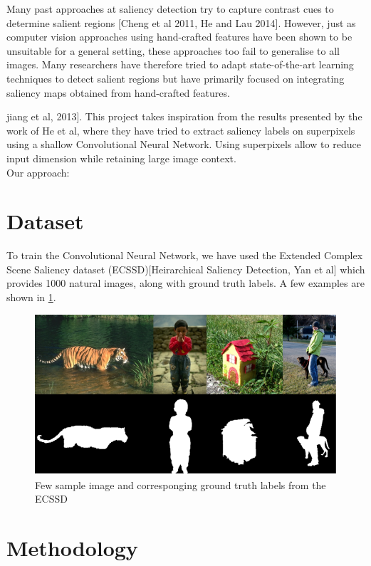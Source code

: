 \documentclass[journal]{IEEEtran}
\begin{document}
Many past approaches at saliency detection try to capture contrast cues to determine salient regions [Cheng et al 2011, He and Lau 2014]. However, just as computer vision approaches using hand-crafted features have been shown to be unsuitable for a general setting, these approaches too fail to generalise to all images. Many researchers have therefore tried to adapt state-of-the-art learning techniques to detect salient regions but have primarily focused on integrating saliency maps obtained from hand-crafted features. {jiang et al, 2013]. This project takes inspiration from the results presented by the work of He et al, where they have tried to extract saliency labels on superpixels using a shallow Convolutional Neural Network. Using superpixels allow to reduce input dimension while retaining large image context. \\
	
Our approach:
    



\section{Dataset}

To train the Convolutional Neural Network, we have used the Extended Complex Scene Saliency dataset (ECSSD)[Heirarchical Saliency Detection, Yan et al] which provides 1000 natural images, along with ground truth labels. A few examples are shown in \ref{fig1}.
\begin{figure}[h]
	\includegraphics[width=1\linewidth]{dataset_img}
	\caption{Few sample image and corresponging ground truth labels from the ECSSD}
	\label{fig1}
\end{figure}



\section{Methodology}
\label{sec4}

}
\end{document}
